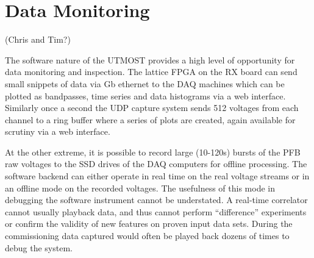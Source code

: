 \section{Data Monitoring }(Chris and Tim?)

The software nature of the UTMOST provides a high level of opportunity for data monitoring and inspection. The lattice FPGA on the RX board can send small snippets of data via Gb ethernet to the DAQ machines which can be plotted as bandpasses, time series and data histograms via a web interface. Similarly once a second the UDP capture system sends 512 voltages from each channel to a ring buffer where a series of plots are created, again available for scrutiny via a web interface.

At the other extreme, it is possible to record large (10-120s) bursts of the PFB raw voltages to the SSD drives of the DAQ computers for offline processing. The software backend can either operate in real time on the real voltage streams or in an offline mode on the recorded voltages. The usefulness of this mode in debugging the software instrument cannot be understated. A real-time correlator cannot usually playback data, and thus cannot perform ``difference'' experiments or confirm the validity of new features on proven input data sets. During the commissioning data captured would often be played back dozens of times to debug the system.

